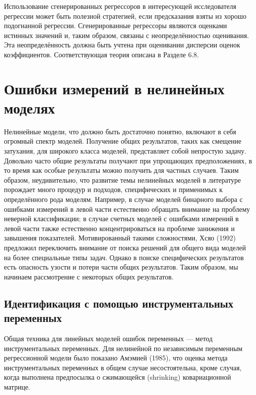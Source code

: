Использование сгенерированных регрессоров в интересующей исследователя регрессии  может быть полезной стратегией, если предсказания взяты из хорошо подогнанной регрессии. Сгенерированные регрессоры являются оценками истинных значений и, таким образом, связаны с неопределённостью оценивания. Эта неопределённость должна быть учтена при оценивании дисперсии оценок коэффициентов. Соответствующая теория описана в Разделе 6.8.

\section{Ошибки измерений в нелинейных моделях} 

Нелинейные модели, что должно быть достаточно понятно, включают в себя огромный спектр моделей. Получение общих результатов, таких как смещение затухания, для широкого класса моделей, представляет собой непростую задачу. Довольно часто общие результаты получают при упрощающих  предположениях, в то время как особые результаты можно получить для частных случаев. Таким образом, неудивительно, что развитие темы нелинейных моделей в литературе порождает много процедур и подходов, специфических и применимых к определённого рода моделям. Например, в случае моделей бинарного выбора с ошибками измерений в левой части естественно обращать внимание на проблему неверной классификации; в случае счетных моделей  с ошибками измерений в левой части также естественно концентрироваться на проблеме занижения и завышения показателей. Мотивированный такими сложностями, Хсяо (1992) предложил переключить внимание от поиска решений для общего вида моделей на более специальные типы задач. Однако в поиске специфических результатов есть опасность узости и потери части общих результатов. Таким образом, мы начинаем рассмотрение с некоторых общих результатов.

\subsection{Идентификация с помощью инструментальных переменных} 

Общая техника для линейных моделей ошибок переменных --– метод инструментальных переменных. Для нелинейной по независимым переменным регрессионной модели было показано Амэмией (1985), что оценка метода инструментальных переменных в общем случае несостоятельна, кроме случая, когда выполнена предпосылка о сжимающейся (shrinking) ковариационной матрице.

